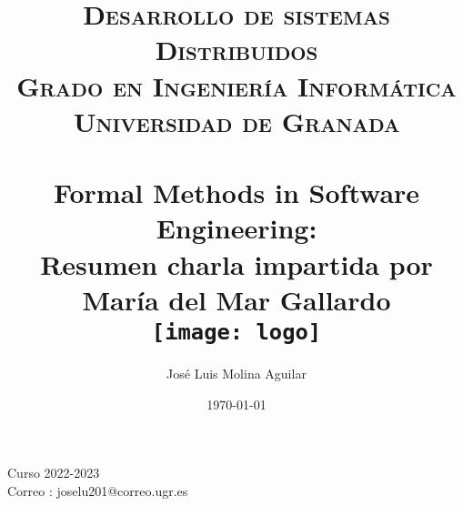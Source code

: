 
\usepackage{listings}

\everymath{\displaystyle}

\title{	
\normalfont \normalsize 
\textsc{\textbf{Desarrollo de sistemas Distribuidos} \\ Grado en Ingeniería Informática \\ Universidad de Granada} \\ [25pt] %
\horrule{0.5pt} \\[0.4cm] %
\huge Formal Methods in Software Engineering: \\ %
Resumen charla impartida por María del Mar Gallardo 
\horrule{2pt} \\[0.5cm] %
\texttt{[image: logo]}\\[8ex]
}




\author{José Luis Molina Aguilar} %

\date{\normalsize\today} %






\maketitle %
  \begin{large}
    \centering
  \vfill
  
  Curso 2022-2023\\
  Correo : joselu201@correo.ugr.es
  \vfill
  \end{large}
\newpage %

\tableofcontents %



\newpage



\newpage
